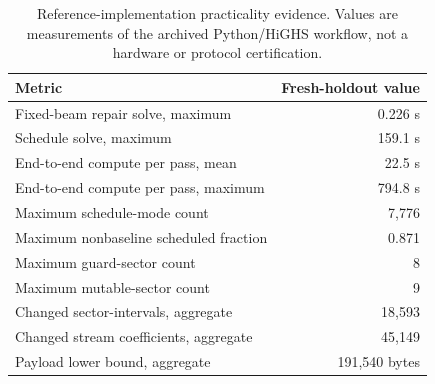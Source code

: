 \begin{table}[t]
\caption{Reference-implementation practicality evidence. Values are measurements of the archived Python/HiGHS workflow, not a hardware or protocol certification.}
\label{tab:practicality}
\centering
\footnotesize
\setlength{\tabcolsep}{3.0pt}
\renewcommand{\arraystretch}{1.08}
\begin{tabular}{@{}lr@{}}
\toprule
Metric & Fresh-holdout value\\
\midrule
Fixed-beam repair solve, maximum & 0.226 s\\
Schedule solve, maximum & 159.1 s\\
End-to-end compute per pass, mean & 22.5 s\\
End-to-end compute per pass, maximum & 794.8 s\\
Maximum schedule-mode count & 7,776\\
Maximum nonbaseline scheduled fraction & 0.871\\
Maximum guard-sector count & 8\\
Maximum mutable-sector count & 9\\
Changed sector-intervals, aggregate & 18,593\\
Changed stream coefficients, aggregate & 45,149\\
Payload lower bound, aggregate & 191,540 bytes\\
\bottomrule
\end{tabular}
\end{table}
